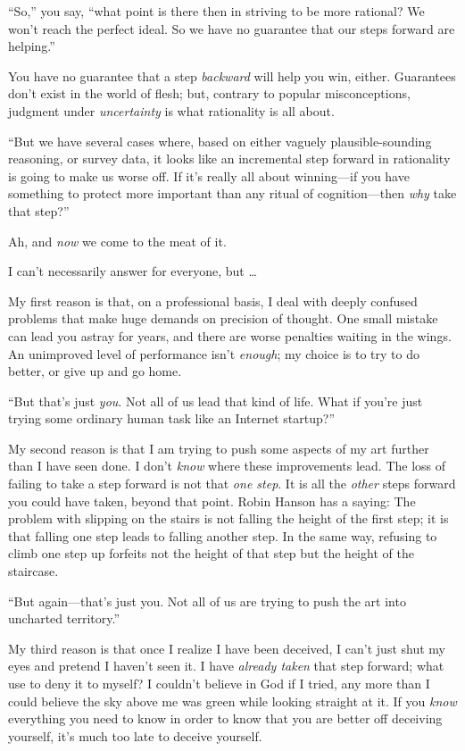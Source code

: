 {
 ``So,'' you say,
``what point is there then in striving to be more
rational? We won't reach the perfect ideal. So we have
no guarantee that our steps forward are helping.''}

{
 You have no guarantee that a step \textit{backward} will help you
win, either. Guarantees don't exist in the world of
flesh; but, contrary to popular misconceptions, judgment under
\textit{uncertainty} is what rationality is all about.}

{
 ``But we have several cases where, based on
either vaguely plausible-sounding reasoning, or survey data, it looks
like an incremental step forward in rationality is going to make us
worse off. If it's really all about winning---if you
have something to protect more important than any ritual of
cognition---then \textit{why} take that step?''}

{
 Ah, and \textit{now} we come to the meat of it.}

{
 I can't necessarily answer for everyone, but
\ldots}

{
 My first reason is that, on a professional basis, I deal with
deeply confused problems that make huge demands on precision of
thought. One small mistake can lead you astray for years, and there are
worse penalties waiting in the wings. An unimproved level of
performance isn't \textit{enough}; my choice is to try
to do better, or give up and go home.}

{
 ``But that's just \textit{you}.
Not all of us lead that kind of life. What if you're
just trying some ordinary human task like an Internet
startup?''}

{
 My second reason is that I am trying to push some aspects of my
art further than I have seen done. I don't
\textit{know} where these improvements lead. The loss of failing to
take a step forward is not that \textit{one step}. It is all the
\textit{other} steps forward you could have taken, beyond that point.
Robin Hanson has a saying: The problem with slipping on the stairs is
not falling the height of the first step; it is that falling one step
leads to falling another step. In the same way, refusing to climb one
step up forfeits not the height of that step but the height of the
staircase.}

{
 ``But again---that's just you.
Not all of us are trying to push the art into uncharted
territory.''}

{
 My third reason is that once I realize I have been deceived, I
can't just shut my eyes and pretend I
haven't seen it. I have \textit{already taken} that
step forward; what use to deny it to myself? I couldn't
believe in God if I tried, any more than I could believe the sky above
me was green while looking straight at it. If you \textit{know}
everything you need to know in order to know that you are better off
deceiving yourself, it's much too late to deceive
yourself.}

